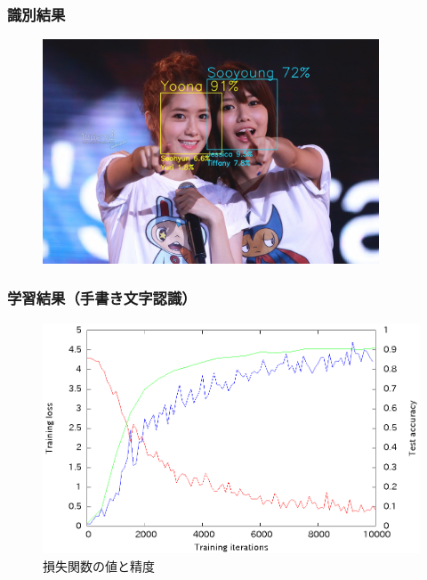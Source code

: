\documentclass[dvipdfmx,11pt,notheorems]{beamer}
\theoremstyle{definition}
\begin{document}
\begin{frame}\frametitle{識別結果}
\begin{figure}[t]
  \begin{center}
    \includegraphics[clip,width=10cm, bb = 0 0 1500 1000]{./fig/jpg/yoona_sooyoung.jpg}\\
  \end{center}
\end{figure}
\end{frame}

\begin{frame}\frametitle{学習結果（手書き文字認識）}
 \begin{figure}[ht]
 \centering
 \includegraphics[scale=1]{fig/eps/result_train_test_tegaki_graph.eps}
 \caption{損失関数の値と精度}
\end{figure}
\end{frame}
\end{document}
